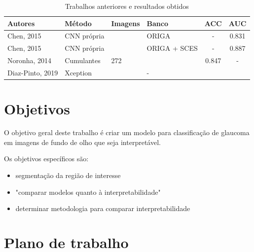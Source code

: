 \documentclass[12pt]{article}
\begin{document}

\begin{table}[htb]
    \centering
    \begin{tabular}{|l|l|l|l|c|c|}
    \hline
    Autores          & Método          & Imagens & Banco        & ACC     & AUC   \\
    \hline
    Chen, 2015       & CNN própria     &         & ORIGA        & -       & 0.831 \\
    \hline
    Chen, 2015       & CNN própria     &         & ORIGA + SCES & -       & 0.887 \\
    \hline
    Noronha, 2014    & Cumulantes      & 272     &              & 0.847  &  -     \\
    \hline
    Diaz-Pinto, 2019 & Xception        &         & -            &        &        \\
    \hline
    \end{tabular}
    \caption{Trabalhos anteriores e resultados obtidos}
    \label{tab:trabalhos}
\end{table}

\bigskip

\section{Objetivos}
\label{sec:objetivo}

O objetivo geral deste trabalho é criar um modelo para classificação de glaucoma em imagens de fundo de olho que seja interpretável.

Os objetivos específicos são:
\begin{itemize}
 \item segmentação da região de interesse
 \item "comparar modelos quanto à interpretabilidade"
 \item determinar metodologia para comparar interpretabilidade
\end{itemize}

\bigskip

\section{Plano de trabalho}
\label{sec:schedule}
\end{document}
